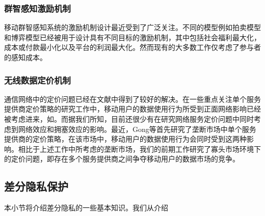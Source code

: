 \subsubsection{群智感知激励机制}
移动群智感知系统的激励机制设计最近受到了广泛关注\cite{yang2012crowdsourcing,feng2014trac,Zhao,wen2015quality,zhang2015incentivize,zhang2015truthful,jin2015quality,jin2016inception,zhang2016privacy,duan2012incentive,Shibo14,peng2015pay,cheung2015distributed,he2017exchange}。不同的模型例如拍卖模型\cite{yang2012crowdsourcing,feng2014trac,Zhao,wen2015quality,zhang2015incentivize,zhang2015truthful,jin2015quality,jin2016inception,zhang2016privacy}和博弈模型\cite{duan2012incentive,Shibo14,peng2015pay,cheung2015distributed,he2017exchange}已经被用于设计具有不同目标的激励机制，其中包括社会福利最大化\cite{cheung2015distributed,gao2015providing,jin2015quality}，成本或付款最小化\cite{feng2014trac,jin2016inception}以及平台的利润最大化\cite{Shibo14,zhang2016privacy}。然而现有的大多数工作\cite{yang2012crowdsourcing,feng2014trac,Zhao,wen2015quality,zhang2015incentivize,zhang2015truthful,jin2015quality}仅考虑了参与者的感知成本。

\subsubsection{无线数据定价机制}
通信网络中的定价问题已经在文献\cite{Walrand08,Huang10,Xinbin,CaoTVT,Xiaoming}中得到了较好的解决。在一些重点关注单个服务提供商定价策略的研究工作中，移动用户的数据使用行为所受到正面网络影响已经被考虑进来，如\cite{Hartline08,Candogan12,SwapnaES12}。而据我们所知，目前还很少有在研究网络服务定价问题中同时考虑到网络效应和拥塞效应的影响。最近，Gong等\cite{GongDCZ17}首先研究了垄断市场中单个服务提供商的定价策略，在该市场中，移动用户的数据使用行为会同时受到这两种影响。相比于上述工作中所考虑的垄断市场，我们的前期工作\cite{MYCISS16}研究了寡头市场环境下的定价问题，即存在多个服务提供商之间争夺移动用户的数据市场的竞争。
\fi

\iffalse
\subsection{差分隐私保护}
本小节将介绍差分隐私的一些基本知识。我们从介绍

